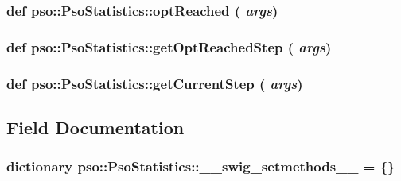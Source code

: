 \hypertarget{classpso_1_1PsoStatistics_8fbbedca5be7957f8120734aa7876d95}{
\subsubsection{\setlength{\rightskip}{0pt plus 5cm}def pso::PsoStatistics::optReached ( {\em args})}}
\label{classpso_1_1PsoStatistics_8fbbedca5be7957f8120734aa7876d95}


\hypertarget{classpso_1_1PsoStatistics_f0302c9c2a64baa9b5ae6af5307874e1}{
\subsubsection{\setlength{\rightskip}{0pt plus 5cm}def pso::PsoStatistics::getOptReachedStep ( {\em args})}}
\label{classpso_1_1PsoStatistics_f0302c9c2a64baa9b5ae6af5307874e1}


\hypertarget{classpso_1_1PsoStatistics_f594fa00dcb1921bd9c644245d05d9a5}{
\subsubsection{\setlength{\rightskip}{0pt plus 5cm}def pso::PsoStatistics::getCurrentStep ( {\em args})}}
\label{classpso_1_1PsoStatistics_f594fa00dcb1921bd9c644245d05d9a5}




\subsection{Field Documentation}
\hypertarget{classpso_1_1PsoStatistics_4f34482049d8ceabd3c27e28ca82fed9}{
\subsubsection{\setlength{\rightskip}{0pt plus 5cm}dictionary {\bf pso::PsoStatistics::\_\-\_\-swig\_\-setmethods\_\-\_\-} = \{\}}}
\label{classpso_1_1PsoStatistics_4f34482049d8ceabd3c27e28ca82fed9}


